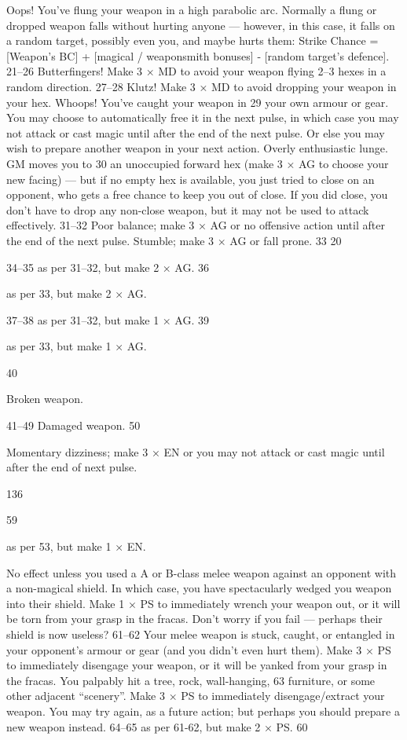 \documentclass[a4paper]{article}
\begin{document}
\begin{multicols}{3}
Oops! You’ve flung your weapon in a high
parabolic arc. Normally a flung or dropped
weapon falls without hurting anyone —
however, in this case, it falls on a random
target, possibly even you, and maybe hurts
them: Strike Chance = [Weapon’s BC] +
[magical / weaponsmith bonuses] - [random
target’s defence].
21–26 Butterfingers! Make 3 × MD to avoid your
weapon flying 2–3 hexes in a random direction.
27–28 Klutz! Make 3 × MD to avoid dropping your
weapon in your hex.
Whoops! You’ve caught your weapon in
29
your own armour or gear. You may choose
to automatically free it in the next pulse, in
which case you may not attack or cast magic
until after the end of the next pulse. Or else
you may wish to prepare another weapon in
your next action.
Overly enthusiastic lunge. GM moves you to
30
an unoccupied forward hex (make 3 × AG to
choose your new facing) — but if no empty
hex is available, you just tried to close on an
opponent, who gets a free chance to keep
you out of close. If you did close, you don’t
have to drop any non-close weapon, but it
may not be used to attack effectively.
31–32 Poor balance; make 3 × AG or no offensive
action until after the end of the next pulse.
Stumble; make 3 × AG or fall prone.
33
20

34–35 as per 31–32, but make 2 × AG.
36

as per 33, but make 2 × AG.

37–38 as per 31–32, but make 1 × AG.
39

as per 33, but make 1 × AG.

40

Broken weapon.

41–49 Damaged weapon.
50

Momentary dizziness; make 3 × EN or you
may not attack or cast magic until after the
end of next pulse.

136

59

as per 53, but make 1 × EN.

No effect unless you used a A or B-class
melee weapon against an opponent with a
non-magical shield. In which case, you have
spectacularly wedged you weapon into their
shield. Make 1 × PS to immediately wrench
your weapon out, or it will be torn from
your grasp in the fracas. Don’t worry if you
fail — perhaps their shield is now useless?
61–62 Your melee weapon is stuck, caught, or
entangled in your opponent’s armour or gear
(and you didn’t even hurt them). Make 3 ×
PS to immediately disengage your weapon,
or it will be yanked from your grasp in the
fracas.
You palpably hit a tree, rock, wall-hanging,
63
furniture, or some other adjacent “scenery”.
Make 3 × PS to immediately disengage/extract your weapon. You may try
again, as a future action; but perhaps you
should prepare a new weapon instead.
64–65 as per 61-62, but make 2 × PS.
60


\end{multicols}
\end{document}
